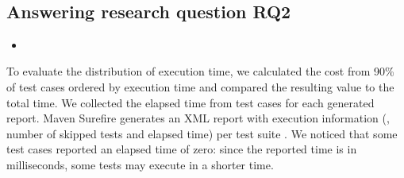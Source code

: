 \begin{figure}[h!]%
    \centering
    \begin{minipage}{0.5\textwidth}
        \\
    \end{minipage}%
    \caption{}%
    \label{fig:scatters}%
\end{figure}

\subsection{Answering research question RQ2}
\label{sec:rqTwo}

\begin{itemize}
    \item \RQC
\end{itemize}

To evaluate the distribution of execution time, we calculated the cost
from 90\% of test cases ordered by execution time and compared the
resulting value to the total time.  We collected the elapsed time from
test cases for each generated report. Maven Surefire generates an XML
report with execution information (\eg, number of skipped tests and
elapsed time) per test suite . We noticed that some test
cases reported an elapsed time of zero: since the reported time is in
milliseconds, some tests may execute in a shorter time.

